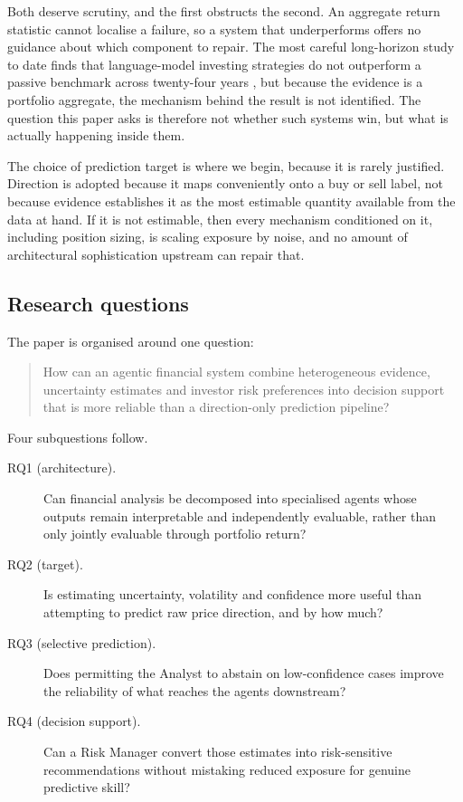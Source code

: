 \documentclass[pdflatex,sn-apa]{sn-jnl}%
\theoremstyle{thmstyleone}%
\theoremstyle{thmstyletwo}%
\theoremstyle{thmstylethree}%
\begin{document}
Both deserve scrutiny, and the first obstructs the second. An aggregate return
statistic cannot localise a failure, so a system that underperforms offers no
guidance about which component to repair. The most careful long-horizon study
to date finds that language-model investing strategies do not outperform a
passive benchmark across twenty-four years \citep{li2025finsaber}, but because
the evidence is a portfolio aggregate, the mechanism behind the result is not
identified. The question this paper asks is therefore not whether such systems
win, but what is actually happening inside them.

The choice of prediction target is where we begin, because it is rarely
justified. Direction is adopted because it maps conveniently onto a buy or sell
label, not because evidence establishes it as the most estimable quantity
available from the data at hand. If it is not estimable, then every mechanism
conditioned on it, including position sizing, is scaling exposure by noise, and
no amount of architectural sophistication upstream can repair that.

\subsection{Research questions}\label{subsec:rqs}

The paper is organised around one question:

\begin{quote}
How can an agentic financial system combine heterogeneous evidence,
uncertainty estimates and investor risk preferences into decision support that
is more reliable than a direction-only prediction pipeline?
\end{quote}

Four subquestions follow.

\begin{description}
\item[RQ1 (architecture).] Can financial analysis be decomposed into
specialised agents whose outputs remain interpretable and independently
evaluable, rather than only jointly evaluable through portfolio return?

\item[RQ2 (target).] Is estimating uncertainty, volatility and confidence more
useful than attempting to predict raw price direction, and by how much?

\item[RQ3 (selective prediction).] Does permitting the Analyst to abstain on
low-confidence cases improve the reliability of what reaches the agents
downstream?

\item[RQ4 (decision support).] Can a Risk Manager convert those estimates into
risk-sensitive recommendations without mistaking reduced exposure for genuine
predictive skill?
\end{description}
\end{document}
